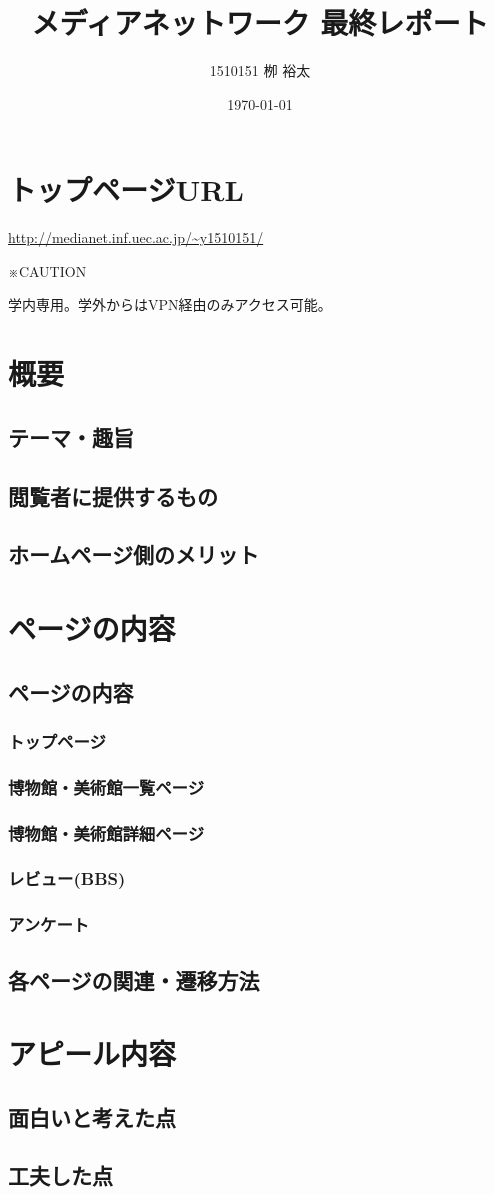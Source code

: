 \documentclass[11pt,a4paper, uplatex]{jsarticle}
\title{メディアネットワーク 最終レポート}
\author{1510151  栁 裕太}
\date{\today}
\begin{document}
\maketitle

\section{トップページURL}
 \url{http://medianet.inf.uec.ac.jp/~y1510151/}

※CAUTION

学内専用。学外からはVPN経由のみアクセス可能。

\section{概要}
\subsection{テーマ・趣旨}
\subsection{閲覧者に提供するもの}
\subsection{ホームページ側のメリット}

\section{ページの内容}
\subsection{ページの内容}
\subsubsection{トップページ}
\subsubsection{博物館・美術館一覧ページ}
\subsubsection{博物館・美術館詳細ページ}
\subsubsection{レビュー(BBS)}
\subsubsection{アンケート}
\subsection{各ページの関連・遷移方法}

\section{アピール内容}
\subsection{面白いと考えた点}
\subsection{工夫した点}
\end{document}
